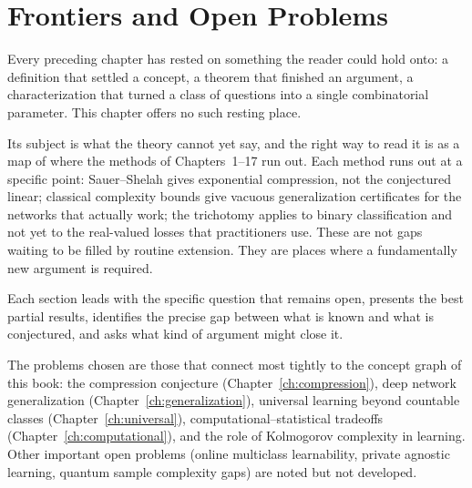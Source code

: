 
\chapter{Frontiers and Open Problems}
\label{ch:frontiers}

Every preceding chapter has rested on something the reader could hold onto: a definition that settled a concept, a theorem that finished an argument, a characterization that turned a class of questions into a single combinatorial parameter.  This chapter offers no such resting place.

Its subject is what the theory cannot yet say, and the right way to read it is as a map of where the methods of Chapters~1--17 run out.  Each method runs out at a specific point: Sauer--Shelah gives exponential compression, not the conjectured linear; classical complexity bounds give vacuous generalization certificates for the networks that actually work; the trichotomy applies to binary classification and not yet to the real-valued losses that practitioners use.  These are not gaps waiting to be filled by routine extension.  They are places where a fundamentally new argument is required.

Each section leads with the specific question that remains open, presents the best partial results, identifies the precise gap between what is known and what is conjectured, and asks what kind of argument might close it.

The problems chosen are those that connect most tightly to the concept graph of this book: the compression conjecture (Chapter~\ref{ch:compression}), deep network generalization (Chapter~\ref{ch:generalization}), universal learning beyond countable classes (Chapter~\ref{ch:universal}), computational--statistical tradeoffs (Chapter~\ref{ch:computational}), and the role of Kolmogorov complexity in learning.  Other important open problems (online multiclass learnability, private agnostic learning, quantum sample complexity gaps) are noted but not developed.

\medskip

